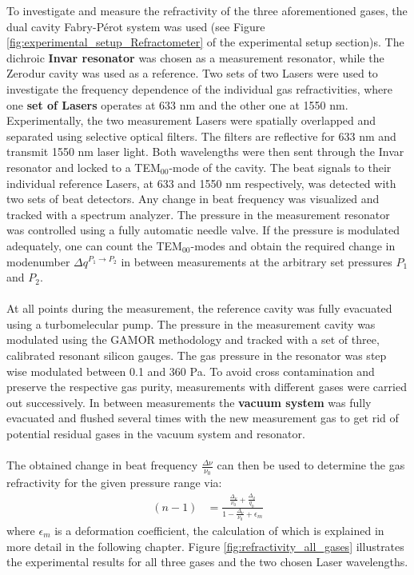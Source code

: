To investigate and measure the refractivity of the three aforementioned gases, the dual cavity Fabry-Pérot system was used (see Figure \ref{fig:experimental_setup_Refractometer} of the experimental setup section)s. The dichroic \textbf{Invar resonator} was chosen as a measurement resonator, while the Zerodur cavity was used as a reference. Two sets of two Lasers were used to investigate the frequency dependence of the individual gas refractivities, where one \textbf{set of Lasers} operates at 633 nm and the other one at 1550 nm. Experimentally, the two measurement Lasers were spatially overlapped and separated using selective optical filters. The filters are reflective for 633 nm and transmit 1550 nm laser light. Both wavelengths were then sent through the Invar resonator and locked to a TEM$_{00}$-mode of the cavity. The beat signals to their individual reference Lasers, at 633 and 1550 nm respectively, was detected with two sets of beat detectors. Any change in beat frequency was visualized and tracked with a spectrum analyzer. The pressure in the measurement resonator was controlled using a fully automatic needle valve. If the pressure is modulated adequately, one can count the TEM$_{00}$-modes and obtain the required change in modenumber $\Delta q^{P_1 \rightarrow P_2}$ in between measurements at the arbitrary set pressures $P_1$ and $P_2$.\\\\
At all points during the measurement, the reference cavity was fully evacuated using a turbomelecular pump. The pressure in the measurement cavity was modulated using the GAMOR methodology and tracked with a set of three, calibrated resonant silicon gauges. The gas pressure in the resonator was step wise modulated between 0.1 and 360 Pa. To avoid cross contamination and preserve the respective gas purity, measurements with different gases were carried out successively. In between measurements the \textbf{vacuum system} was fully evacuated and flushed several times with the new measurement gas to get rid of potential residual gases in the vacuum system and resonator.\\\\
The obtained change in beat frequency $\frac{\Delta \nu}{\nu_0} $ can then be used to determine the gas refractivity for the given pressure range via:
\begin{align}
	(n-1) &= \frac{\frac{\Delta_{\nu}}{\nu_0}+\frac{\Delta_q}{q_0}}{1-\frac{\Delta_{\nu}}{\nu_0} +\epsilon_m}
\end{align}
where $\epsilon_m$ is a deformation coefficient, the calculation of which is explained in more detail in the following chapter. Figure \ref{fig:refractivity_all_gases} illustrates the experimental results for all three gases and the two chosen Laser wavelengths.

